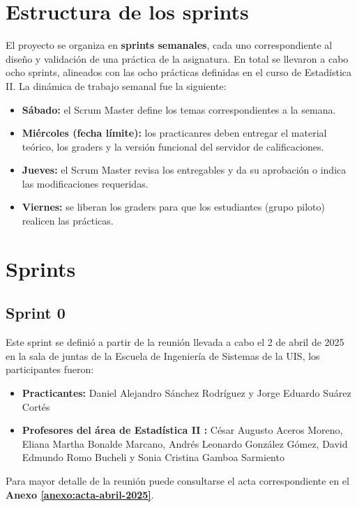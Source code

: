 \documentclass[letter,oneside,12pt,spanish]{report}
\begin{document}
\section{Estructura de los sprints}

El proyecto se organiza en \textbf{sprints semanales}, cada uno correspondiente al diseño y validación de una práctica de la asignatura. En total se llevaron a cabo ocho sprints, alineados con las ocho prácticas definidas en el curso de Estadística II. La dinámica de trabajo semanal fue la siguiente:

\begin{itemize}
	\item \textbf{Sábado:} el Scrum Master define los temas correspondientes a la semana.  
	\item \textbf{Miércoles (fecha límite):} los practicanres deben entregar el material teórico, los graders y la versión funcional del servidor de calificaciones.  
	\item \textbf{Jueves:} el Scrum Master revisa los entregables y da su aprobación o indica las modificaciones requeridas.  
	\item \textbf{Viernes:} se liberan los graders para que los estudiantes (grupo piloto) realicen las prácticas.  
\end{itemize}

\section{Sprints}
\subsection{Sprint 0}

Este sprint se definió a partir de la reunión llevada a cabo el 2 de abril de 2025 en la sala de juntas de la Escuela de Ingeniería de Sistemas de la UIS, los participantes fueron:

\begin{itemize}
	\item \textbf{Practicantes:} Daniel Alejandro Sánchez Rodríguez y Jorge Eduardo Suárez Cortés
	
	\item \textbf{Profesores del área de Estadística II :} César Augusto Aceros Moreno, Eliana Martha Bonalde Marcano, Andrés Leonardo González Gómez, David Edmundo Romo Bucheli y Sonia Cristina Gamboa Sarmiento
\end{itemize}

\noindent Para mayor detalle de la reunión puede consultarse el acta correspondiente en el \textbf{Anexo \ref{anexo:acta-abril-2025}}.
\end{document}
